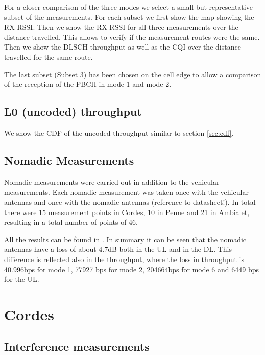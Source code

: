 \documentclass[a4paper,10pt]{article}
\begin{document}
For a closer comparison of the three modes we select a small but representative subset of the measurements. For each subset we first show the map showing the RX RSSI. Then we show the RX RSSI for all three measurements over the distance travelled. This allows to verify if the measurement routes were the same. Then we show the DLSCH throughput as well as the CQI over the distance travelled for the same route. 

The last subset (Subset 3) has been chosen on the cell edge to allow a comparison of the reception of the PBCH in mode 1 and mode 2.



\subsection{L0 (uncoded) throughput}

We show the CDF of the uncoded throughput similar to section \ref{sec:cdf}.

\subsection{Nomadic Measurements}

Nomadic measurements were carried out in addition to the vehicular measurements. Each nomadic measurement was taken once with the vehicular antennas and once with the nomadic antennas (reference to datasheet!). In total there were 15 measurement points in Cordes, 10 in Penne and 21 in Ambialet, resulting in a total number of points of 46.

All the results can be found in \cite{nomadic}. In summary it can be seen that the nomadic antennas have a loss of about 4.7dB both in the UL and in the DL. This difference is reflected also in the throughput, where the loss in throughput is 40.996bps for mode 1, 77927 bps for mode 2, 204664bps for mode 6 and 6449 bps for the UL.


\section{Cordes}
\label{sec:cordes}

\subsection{Interference measurements}
\end{document}
